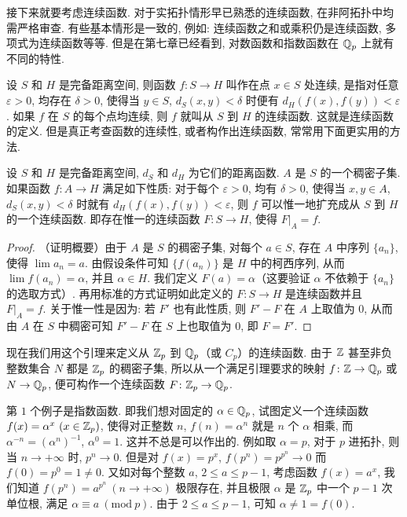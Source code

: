 接下来就要考虑连续函数. 对于实拓扑情形早已熟悉的连续函数, 在非阿拓扑中均需严格审查. 有些基本情形是一致的, 例如: 连续函数之和或乘积仍是连续函数, 多项式为连续函数等等. 但是在第七章已经看到, 对数函数和指数函数在 $\mathbb{Q}_p$ 上就有不同的特性.

设 $S$ 和 $H$ 是完备距离空间, 则函数 $f\colon S\to H$ 叫作在点 $x\in S$ 处连续, 是指对任意 $\varepsilon>0$, 均存在 $\delta>0$, 使得当 $y\in S$, $d_S(x,y)<\delta$ 时便有 $d_H(f(x),f(y))<\varepsilon$. 如果 $f$ 在 $S$ 的每个点均连续, 则 $f$ 就叫从 $S$ 到 $H$ 的连续函数. 这就是连续函数的定义. 但是真正考查函数的连续性, 或者构作出连续函数, 常常用下面更实用的方法.

\begin{lemma}\label{lem:ch9-6}
设 $S$ 和 $H$ 是完备距离空间, $d_S$ 和 $d_H$ 为它们的距离函数. $A$ 是 $S$ 的一个稠密子集. 如果函数 $f\colon A\to H$ 满足如下性质: 对于每个 $\varepsilon>0$, 均有 $\delta>0$, 使得当 $x,y\in A$, $d_S(x,y)<\delta$ 时就有 $d_H(f(x),f(y))<\varepsilon$, 则 $f$ 可以惟一地扩充成从 $S$ 到 $H$ 的一个连续函数. 即存在惟一的连续函数 $F\colon S\to H$, 使得 $F|_A=f$.
\end{lemma}

\begin{proof}
（证明概要）由于 $A$ 是 $S$ 的稠密子集, 对每个 $a\in S$, 存在 $A$ 中序列 $\{a_n\}$, 使得 $\lim a_n=a$. 由假设条件可知 $\{f(a_n)\}$ 是 $H$ 中的柯西序列, 从而 $\lim f(a_n)=\alpha$, 并且 $\alpha\in H$. 我们定义 $F(a)=\alpha$（这要验证 $\alpha$ 不依赖于 $\{a_n\}$ 的选取方式）. 再用标准的方式证明如此定义的 $F\colon S\to H$ 是连续函数并且 $F|_A=f$. 关于惟一性是因为: 若 $F'$ 也有此性质, 则 $F'-F$ 在 $A$ 上取值为 $0$, 从而由 $A$ 在 $S$ 中稠密可知 $F'-F$ 在 $S$ 上也取值为 $0$, 即 $F=F'$.
\end{proof}

现在我们用这个引理来定义从 $\mathbb{Z}_p$ 到 $\mathbb{Q}_p$（或 $C_p$）的连续函数. 由于 $\mathbb{Z}$ 甚至非负整数集合 $N$ 都是 $\mathbb{Z}_p$ 的稠密子集, 所以从一个满足引理要求的映射 $f\colon\mathbb{Z}\to\mathbb{Q}_p$ 或 $N\to\mathbb{Q}_p$, 便可构作一个连续函数 $F\colon\mathbb{Z}_p\to\mathbb{Q}_p$.

第 $1$ 个例子是指数函数. 即我们想对固定的 $\alpha\in\mathbb{Q}_p$, 试图定义一个连续函数 $f(x)=\alpha^x\ (x\in\mathbb{Z}_p)$, 使得对正整数 $n$, $f(n)=\alpha^n$ 就是 $n$ 个 $\alpha$ 相乘, 而 $\alpha^{-n}=(\alpha^n)^{-1}$, $\alpha^0=1$. 这并不总是可以作出的. 例如取 $\alpha=p$, 对于 $p$ 进拓扑, 则当 $n\to+\infty$ 时, $p^n\to 0$. 但是对 $f(x)=p^x$, $f(p^n)=p^{p^n}\to 0$ 而 $f(0)=p^0=1\neq 0$. 又如对每个整数 $a$, $2\leqslant a\leqslant p-1$, 考虑函数 $f(x)=a^x$, 我们知道 $f(p^n)=a^{p^n}\ (n\to+\infty)$ 极限存在, 并且极限 $\alpha$ 是 $\mathbb{Z}_p$ 中一个 $p-1$ 次单位根, 满足 $\alpha\equiv a\ (\mathrm{mod}\ p)$. 由于 $2\leqslant a\leqslant p-1$, 可知 $\alpha\neq 1=f(0)$.

